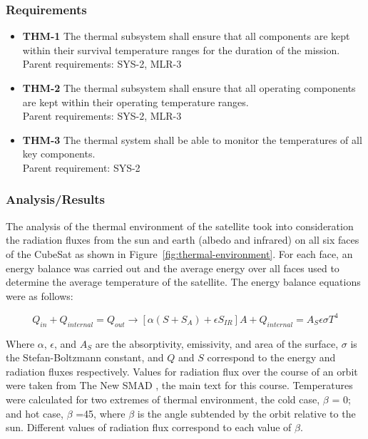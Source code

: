 \documentclass[12pt]{article}
\begin{document}
\subsubsection{Requirements}

\begin{itemize}
	\item \textbf{THM-1} The thermal subsystem shall ensure that all components are kept within their survival temperature ranges for the duration of the mission.
	\\
	Parent requirements: SYS-2, MLR-3
\item \textbf{THM-2} The thermal subsystem shall ensure that all operating components are kept within their operating temperature ranges.
\\
Parent requirements: SYS-2, MLR-3
\item \textbf{THM-3} The thermal system shall be able to monitor the temperatures of all key components.
\\
Parent requirement: SYS-2
\end{itemize}


\subsubsection{Analysis/Results}

The analysis of the thermal environment of the satellite took into consideration the radiation fluxes from the sun and earth (albedo and infrared) on all six faces of the CubeSat as shown in Figure~\ref{fig:thermal-environment}. For each face, an energy balance was carried out and the average energy over all faces used to determine the average temperature of the satellite. The energy balance equations were as follows:

\begin{equation}
Q_{in} + Q_{internal} = Q_{out} \rightarrow [\alpha(S + S_A) + \epsilon S_{IR}] A + Q_{internal} = A_S \epsilon \sigma T^4
\label{eq:thermal-balance}
\end{equation}

Where $\alpha$, $\epsilon$, and $A_S$ are the absorptivity, emissivity, and area of the surface, $\sigma$ is the Stefan-Boltzmann constant, and $Q$ and $S$ correspond to the energy and radiation fluxes respectively. Values for radiation flux over the course of an orbit were taken from The New SMAD \cite[p.~688,~table~22-11]{SMAD}, the main text for this course. Temperatures were calculated for two extremes of thermal environment, the cold case, $\beta$ = 0; and hot case, $\beta$ =45, where $\beta$ is the angle subtended by the orbit relative to the sun.  Different values of radiation flux correspond to each value of $\beta$.
\end{document}
